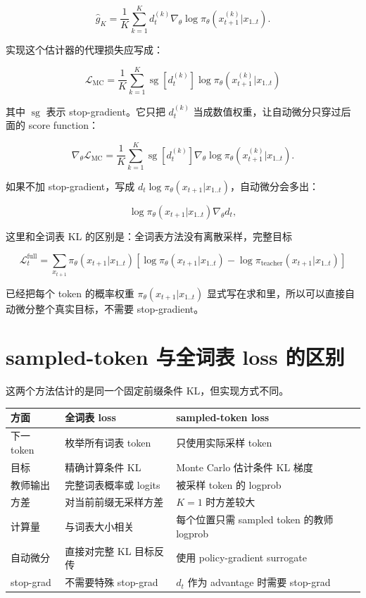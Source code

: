 \documentclass[11pt,a4paper,fontset=fandol]{ctexart}
\begin{document}
\[
\hat g_K
=
\frac1K
\sum_{k=1}^{K}
d_t^{(k)}
\nabla_\theta
\log\pi_\theta(x_{t+1}^{(k)}|x_{1..t}).
\]

实现这个估计器的代理损失应写成：

\[
\boxed{
\mathcal L_{\mathrm{MC}}
=
\frac1K
\sum_{k=1}^{K}
\operatorname{sg}\!\left[d_t^{(k)}\right]
\log\pi_\theta(x_{t+1}^{(k)}|x_{1..t})
}
\]

其中 \(\operatorname{sg}\) 表示 stop-gradient。它只把 \(d_t^{(k)}\) 当成数值权重，让自动微分只穿过后面的 score function：

\[
\nabla_\theta \mathcal L_{\mathrm{MC}}
=
\frac1K
\sum_{k=1}^{K}
\operatorname{sg}\!\left[d_t^{(k)}\right]
\nabla_\theta
\log\pi_\theta(x_{t+1}^{(k)}|x_{1..t}).
\]

如果不加 stop-gradient，写成 \(d_t\log\pi_\theta(x_{t+1}|x_{1..t})\)，自动微分会多出：

\[
\log\pi_\theta(x_{t+1}|x_{1..t})\nabla_\theta d_t,
\]

这里和全词表 KL 的区别是：全词表方法没有离散采样，完整目标

\[
\mathcal L_t^{\text{full}}
=
\sum_{x_{t+1}}
\pi_\theta(x_{t+1}|x_{1..t})
\left[
\log\pi_\theta(x_{t+1}|x_{1..t})
-
\log\pi_{\text{teacher}}(x_{t+1}|x_{1..t})
\right]
\]

已经把每个 token 的概率权重 \(\pi_\theta(x_{t+1}|x_{1..t})\) 显式写在求和里，所以可以直接自动微分整个真实目标，不需要 stop-gradient。

\section{sampled-token 与全词表 loss 的区别}

这两个方法估计的是同一个固定前缀条件 KL，但实现方式不同。

\begin{longtable}{>{\raggedright\arraybackslash}p{}
                  >{\raggedright\arraybackslash}p{}
                  >{\raggedright\arraybackslash}p{}}
\toprule
方面 & 全词表 loss & sampled-token loss \\
\midrule
下一 token & 枚举所有词表 token & 只使用实际采样 token \\
目标 & 精确计算条件 KL & Monte Carlo 估计条件 KL 梯度 \\
教师输出 & 完整词表概率或 logits & 被采样 token 的 logprob \\
方差 & 对当前前缀无采样方差 & \(K=1\) 时方差较大 \\
计算量 & 与词表大小相关 & 每个位置只需 sampled token 的教师 logprob \\
自动微分 & 直接对完整 KL 目标反传 & 使用 policy-gradient surrogate \\
stop-grad & 不需要特殊 stop-grad & \(d_t\) 作为 advantage 时需要 stop-grad \\
\bottomrule
\end{longtable}
\end{document}
